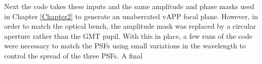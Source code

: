 Next the code takes these inputs and the same amplitude and phase masks used in Chapter \ref{Chapter2} to generate an unaberrated vAPP focal plane.  However, in order to match the optical bench, the amplitude mask was replaced by a circular aperture rather than the GMT pupil.  With this in place, a few runs of the code were necessary to match the PSFs using small variations in the wavelength to control the spread of the three PSFs.  A final   
